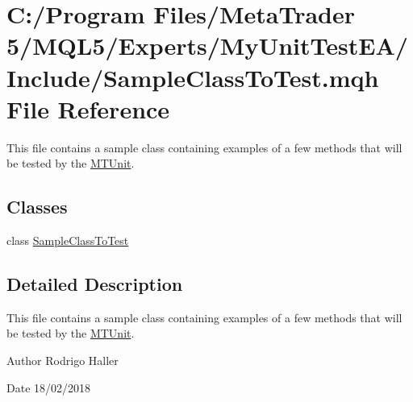 \hypertarget{_sample_class_to_test_8mqh}{}\section{C\+:/\+Program Files/\+Meta\+Trader 5/\+M\+Q\+L5/\+Experts/\+My\+Unit\+Test\+E\+A/\+Include/\+Sample\+Class\+To\+Test.mqh File Reference}
\label{_sample_class_to_test_8mqh}


This file contains a sample class containing examples of a few methods that will be tested by the \mbox{\hyperlink{class_m_t_unit}{M\+T\+Unit}}.  


\subsection*{Classes}
\begin{DoxyCompactItemize}
\item 
class \mbox{\hyperlink{class_sample_class_to_test}{Sample\+Class\+To\+Test}}
\end{DoxyCompactItemize}


\subsection{Detailed Description}
This file contains a sample class containing examples of a few methods that will be tested by the \mbox{\hyperlink{class_m_t_unit}{M\+T\+Unit}}. 

\begin{DoxyAuthor}{Author}
Rodrigo Haller 
\end{DoxyAuthor}
\begin{DoxyDate}{Date}
18/02/2018 
\end{DoxyDate}

